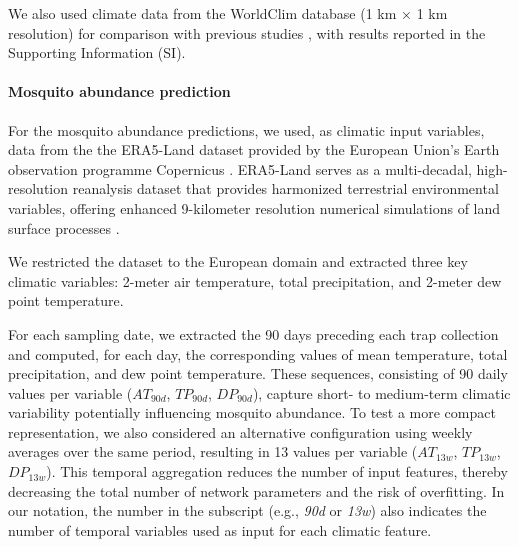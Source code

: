 \documentclass[preprint,12pt]{elsarticle}
\begin{document}
We also used climate data from the WorldClim database \cite{worldclim_2023} (1 km × 1 km resolution) for comparison with previous studies \cite{zardini2024}, with results reported in the Supporting Information (SI).

\paragraph{Mosquito abundance prediction}
For the mosquito abundance predictions, we used, as climatic input variables, data from the the ERA5-Land dataset provided by the European Union's Earth observation programme Copernicus \cite{copernicus_2025}. ERA5-Land serves as a multi-decadal, high-resolution reanalysis dataset that provides harmonized terrestrial environmental variables, offering enhanced 9-kilometer resolution numerical simulations of land surface processes  \cite{ERA5land2019}.

We restricted the dataset to the European domain and extracted three key climatic variables: 2-meter air temperature, total precipitation, and 2-meter dew point temperature.

For each sampling date, we extracted the 90 days preceding each trap collection and computed, for each day, the corresponding values of mean temperature, total precipitation, and dew point temperature. These sequences, consisting of 90 daily values per variable ($AT_{90d}$, $TP_{90d}$, $DP_{90d}$), capture short- to medium-term climatic variability potentially influencing mosquito abundance. To test a more compact representation, we also considered an alternative configuration using weekly averages over the same period, resulting in 13 values per variable ($AT_{13w}$, $TP_{13w}$, $DP_{13w}$). This temporal aggregation reduces the number of input features, thereby decreasing the total number of network parameters and the risk of overfitting. In our notation, the number in the subscript (e.g., \textit{90d} or \textit{13w}) also indicates the number of temporal variables used as input for each climatic feature.
\end{document}
